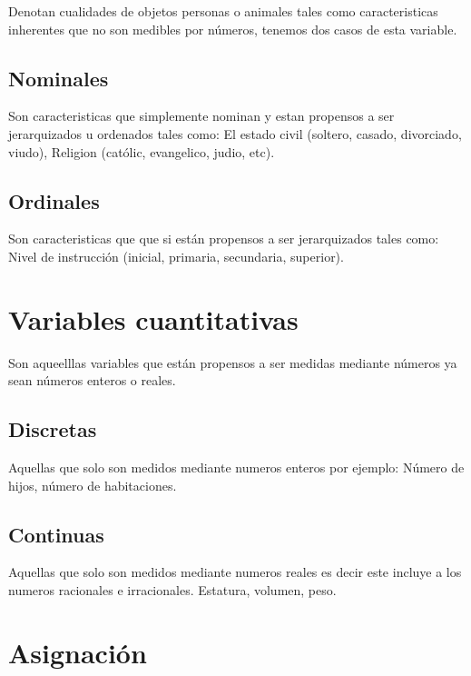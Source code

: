 \documentclass[10pt,]{krantz}
\theoremstyle{definition}
\theoremstyle{definition}
\theoremstyle{definition}
\theoremstyle{definition}
\theoremstyle{remark}
\begin{document}
Denotan cualidades de objetos personas o animales tales como caracteristicas inherentes que no son medibles por números, tenemos dos casos de esta variable.

\hypertarget{nominales}{%
\subsection{Nominales}\label{nominales}}

Son caracteristicas que simplemente nominan y estan propensos a ser jerarquizados u ordenados tales como: El estado civil (soltero, casado, divorciado, viudo), Religion (católic, evangelico, judio, etc).

\hypertarget{ordinales}{%
\subsection{Ordinales}\label{ordinales}}

Son caracteristicas que que si están propensos a ser jerarquizados tales como: Nivel de instrucción (inicial, primaria, secundaria, superior).

\hypertarget{variables-cuantitativas}{%
\section{Variables cuantitativas}\label{variables-cuantitativas}}

Son aqueelllas variables que están propensos a ser medidas mediante números ya sean números enteros o reales.

\hypertarget{discretas}{%
\subsection{Discretas}\label{discretas}}

Aquellas que solo son medidos mediante numeros enteros por ejemplo: Número de hijos, número de habitaciones.

\hypertarget{continuas}{%
\subsection{Continuas}\label{continuas}}

Aquellas que solo son medidos mediante numeros reales es decir este incluye a los numeros racionales e irracionales. Estatura, volumen, peso.

\hypertarget{asignaciuxf3n}{%
\section{Asignación}\label{asignaciuxf3n}}
\end{document}
